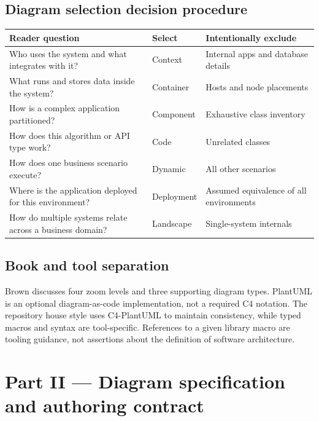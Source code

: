 \documentclass[10pt,letterpaper]{article}
\begin{document}
\subsection{Diagram selection decision procedure}
\begin{tabularx}{\linewidth}{@{}YYY@{}}\toprule
\textbf{Reader question} & \textbf{Select} & \textbf{Intentionally exclude} \\ \midrule
Who uses the system and what integrates with it? & Context & Internal apps and database details \\
What runs and stores data inside the system? & Container & Hosts and node placements \\
How is a complex application partitioned? & Component & Exhaustive class inventory \\
How does this algorithm or API type work? & Code & Unrelated classes \\
How does one business scenario execute? & Dynamic & All other scenarios \\
Where is the application deployed for this environment? & Deployment & Assumed equivalence of all environments \\
How do multiple systems relate across a business domain? & Landscape & Single-system internals \\
\bottomrule\end{tabularx}

\subsection{Book and tool separation}
Brown discusses four zoom levels and three supporting diagram types. PlantUML is an optional diagram-as-code implementation, not a required C4 notation. The repository house style uses C4-PlantUML to maintain consistency, while typed macros and syntax are tool-specific. References to a given library macro are tooling guidance, not assertions about the definition of software architecture.

\section{Part II — Diagram specification and authoring contract}
\end{document}
